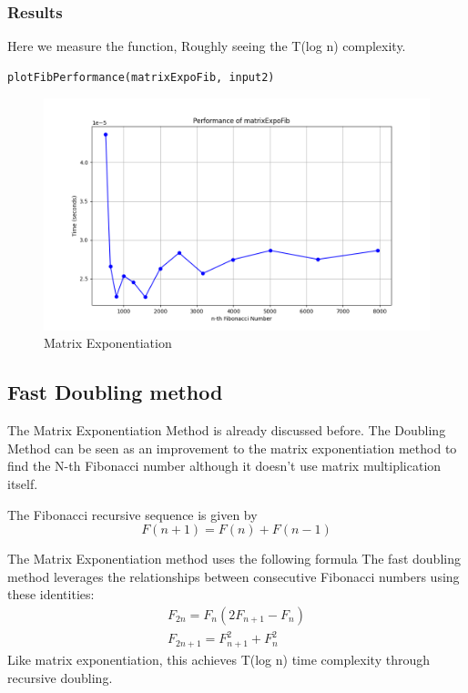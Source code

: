 \documentclass[a4paper, 12pt]{article}
\begin{document}
\subsubsection{Results}
\label{sec:org8ce71eb}
Here we measure the function, Roughly seeing the T(log n) complexity.
\begin{verbatim}
plotFibPerformance(matrixExpoFib, input2)
\end{verbatim}
\begin{figure}[htbp]  %
  \centering  %
  \includegraphics[width=\textwidth]{./matrixExpoFib.png}  %
  \caption{Matrix Exponentiation}  %
\end{figure}
\subsection{Fast Doubling method}
\label{sec:org7e9f33e}
The Matrix Exponentiation Method is already discussed before. The Doubling Method can be seen as an improvement to the matrix exponentiation method to find the N-th Fibonacci number although it doesn’t use matrix multiplication itself.

The Fibonacci recursive sequence is given by 
\[
F(n+1) = F(n) + F(n-1)
\]

The Matrix Exponentiation method uses the following formula
The fast doubling method leverages the relationships between consecutive Fibonacci numbers using these identities:
\begin{align}
\label{eq:4}
F_{2n} = F_n(2F_{n+1} - F_n) \\
F_{2n+1} = F_{n+1}^2 + F_n^2
\end{align}
Like matrix exponentiation, this achieves T(log n) time complexity through recursive doubling.
\end{document}
